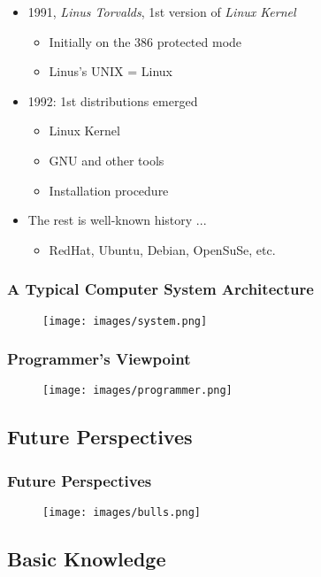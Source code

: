 \documentclass[red]{beamer}
\begin{document}
\begin{CJK*}{GBK}{kai}
\begin{frame}
\begin{itemize}
    \item 1991, \emph{Linus Torvalds}, 1st version of \emph{Linux Kernel}
    \begin{itemize}
        \item Initially on the 386 protected mode
        \item Linus's UNIX = Linux
    \end{itemize}
    \item 1992: 1st distributions emerged
    \begin{itemize}
        \item Linux Kernel
        \item GNU and other tools
        \item Installation procedure
    \end{itemize}
    \item The rest is well-known history ...
    \begin{itemize}
        \item RedHat, Ubuntu, Debian, OpenSuSe, etc.
    \end{itemize}
\end{itemize}
\end{frame}

\begin{frame}
\frametitle{A Typical Computer System Architecture}
\begin{figure}
  \texttt{[image: images/system.png]}
\end{figure}
\end{frame}

\begin{frame}
\frametitle{Programmer's Viewpoint}
\begin{figure}
  \texttt{[image: images/programmer.png]}
\end{figure}
\end{frame}

\subsection{Future Perspectives}
\begin{frame}
\frametitle{Future Perspectives}
\begin{figure}
  \texttt{[image: images/bulls.png]}
\end{figure}
\end{frame}

\subsection{Basic Knowledge}


\end{CJK*}
\end{document}
